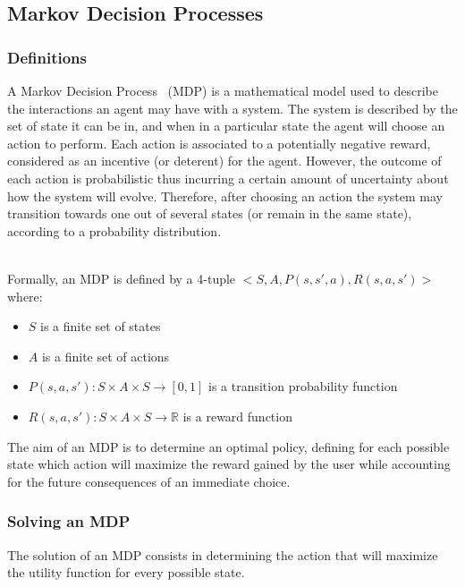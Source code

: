 \newpage
\subsection{Markov Decision Processes}

\subsubsection{Definitions}
A Markov Decision Process~\cite{bellman1957} (MDP) is a mathematical model used to describe the interactions  an agent may have with a system.
The system is described by the set of state it can be in, and when in a particular state the agent will choose an action to perform.
Each action is associated to a potentially negative reward, considered as an incentive (or deterent) for the agent.
However, the outcome of each action is probabilistic thus incurring a certain amount of uncertainty about how the system will evolve.
Therefore, after choosing an action the system may transition towards one out of several states (or remain in the same state), according to a probability distribution.



\textbf{\\}
Formally, an MDP is defined by a 4-tuple $<S,A,P(s,s',a),R(s,a,s')>$ where:
\begin{itemize}
    \item $S$ is a finite set of states
    \item $A$ is a finite set of actions
    \item $P(s,a,s') : S \times A \times S \longrightarrow [0,1]$ is a transition probability function
    \item $R(s,a,s') : S \times A \times S \longrightarrow \mathbb{R}$ is a reward function
\end{itemize}

The aim of an MDP is to determine an optimal policy, defining for each possible state which action will maximize the reward gained by the user while accounting for the future consequences of an immediate choice.

\subsubsection{Solving an MDP}
The solution of an MDP consists in determining the action that will maximize the utility function for every possible state.

